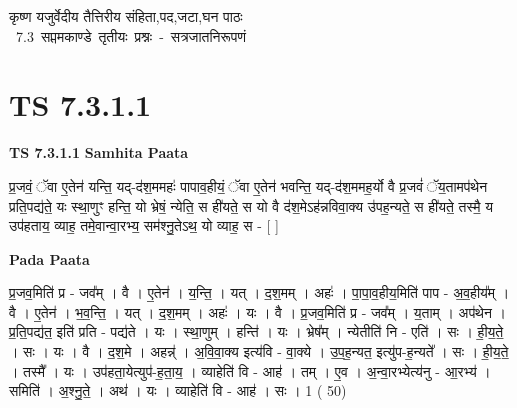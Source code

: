 \documentclass[17pt]{extarticle}
\begin{document}
\begin{titlepage}
    \begin{center}
 
\begin{sanskrit}
    { \Large
    कृष्ण यजुर्वेदीय तैत्तिरीय संहिता,पद,जटा,घन पाठः 
    }
    \\
    \vspace{2.5cm}
    \mbox{ \Large
    7.3      सप्तमकाण्डे तृतीयः प्रश्नः - सत्रजातनिरूपणं   }
\end{sanskrit}
\end{center}

\end{titlepage}
\tableofcontents
{}
\pagebreak


\section{ TS 7.3.1.1 }

\textbf{TS 7.3.1.1 } \newline
\textbf{Samhita Paata} \newline

प्र॒जवं॒ ॅवा ए॒तेन॑ यन्ति॒ यद्-द॑श॒ममहः॑ पापाव॒हीयं॒ ॅवा ए॒तेन॑ भवन्ति॒ यद्-द॑श॒ममह॒र्यो वै प्र॒जवं॑ ॅय॒तामप॑थेन प्रति॒पद्य॑ते॒ यः स्था॒णुꣳ हन्ति॒ यो भ्रेषं॒ न्येति॒ स ही॑यते॒ स यो वै द॑श॒मेऽह॑न्नविवा॒क्य उ॑पह॒न्यते॒ स ही॑यते॒ तस्मै॒ य उप॑हताय॒ व्याह॒ तमे॒वान्वा॒रभ्य॒ सम॑श्नु॒तेऽथ॒ यो व्याह॒ स - [  ] \newline

\textbf{Pada Paata} \newline

प्र॒जव॒मिति॑ प्र - जव᳚म् । वै । ए॒तेन॑ । य॒न्ति॒ । यत् । द॒श॒मम् । अहः॑ । पा॒पा॒व॒हीय॒मिति॑ पाप - अ॒व॒हीय᳚म् । वै । ए॒तेन॑ । भ॒व॒न्ति॒ । यत् । द॒श॒मम् । अहः॑ । यः । वै । प्र॒जव॒मिति॑ प्र - जव᳚म् । य॒ताम् । अप॑थेन । प्र॒ति॒पद्य॑त॒ इति॑ प्रति - पद्य॑ते । यः । स्था॒णुम् । हन्ति॑ । यः । भ्रेष᳚म् । न्येतीति॑ नि - एति॑ । सः । ही॒य॒ते॒ । सः । यः । वै । द॒श॒मे । अहन्न्॑ । अ॒वि॒वा॒क्य इत्य॑वि - वा॒क्ये । उ॒प॒ह॒न्यत॒ इत्यु॑प-ह॒न्यते᳚ । सः । ही॒य॒ते॒ । तस्मै᳚ । यः । उप॑हता॒येत्युप॑-ह॒ता॒य॒ । व्याहेति॑ वि - आह॑ । तम् । ए॒व । अ॒न्वा॒रभ्येत्य॑नु - आ॒रभ्य॑ । समिति॑ । अ॒श्नु॒ते॒ । अथ॑ । यः । व्याहेति॑ वि - आह॑ । सः । 1 ( 50)  \newline




\end{document}
